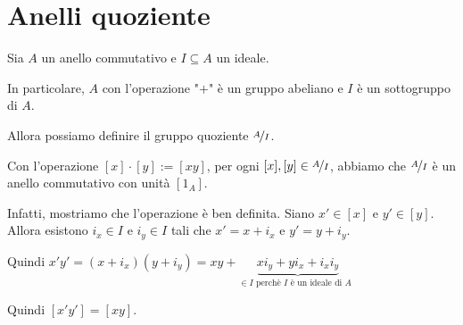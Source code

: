 \documentclass[../main.tex]{subfiles}
\begin{document}
\section{Anelli quoziente}

Sia $A$ un anello commutativo e $I \subseteq A$ un ideale.

In particolare, $A$ con l'operazione "$+$" è un gruppo abeliano e $I$ è un sottogruppo di $A$.

Allora possiamo definire il gruppo quoziente $\nicefrac{A}{I}$.

Con l'operazione $[x] \cdot [y] := [xy]$, per ogni $[x] , [y] \in \nicefrac{A}{I}$, abbiamo che $\nicefrac{A}{I}$ è un anello commutativo con unità $[1_A]$.

Infatti, mostriamo che l'operazione è ben definita. Siano $x' \in [x]$ e $y' \in [y]$. Allora esistono $i_x \in I$ e $i_y \in I$ tali che $x' = x + i_x$ e $y' = y + i_y$.

Quindi $x'y' = (x + i_x) (y + i_y) = xy + \underbrace{x i_y + y i_x + i_x i_y}_{\in I \text{ perchè $I$ è un ideale di $A$ }}$

Quindi $[x'y'] = [xy]$.
\end{document}
